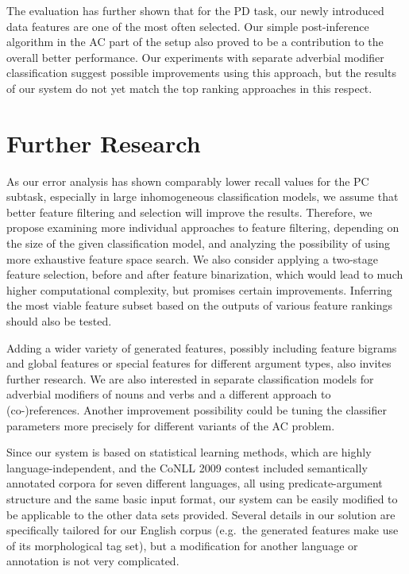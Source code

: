\documentclass[12pt,notitlepage,a4paper]{report}
\begin{document}
The evaluation has further shown that for the PD task, our newly introduced data features are one of the most often selected. Our simple post-inference algorithm in the AC part of the setup also proved to be a contribution to the overall better performance. Our experiments with separate adverbial modifier classification suggest possible improvements using this approach, but the results of our system do not yet match the top ranking approaches in this respect.

\section{Further Research}\label{further-work}

As our error analysis has shown comparably lower recall values for the PC subtask, especially in large inhomogeneous classification models, we assume that better feature filtering and selection will improve the results. Therefore, we propose examining more individual approaches to feature filtering, depending on the size of the given classification model, and analyzing the possibility of using more exhaustive feature space search. We also consider applying a two-stage feature selection, before and after feature binarization, which would lead to much higher computational complexity, but promises certain improvements. Inferring the most viable feature subset based on the outputs of various feature rankings should also be tested.

Adding a wider variety of generated features, possibly including feature bigrams and global features \citep{nugues09} or special features for different argument types, also invites further research. We are also interested in separate classification models for adverbial modifiers of nouns and verbs and a different approach to (co-)references. Another improvement possibility could be tuning the classifier parameters more precisely for different variants of the AC problem.

Since our system is based on statistical learning methods, which are highly language-independent, and the CoNLL 2009 contest included semantically annotated corpora for seven different languages, all using predicate-argument structure and the same basic input format, our system can be easily modified to be applicable to the other data sets provided. Several details in our solution are specifically tailored for our English corpus (e.g.\ the generated features make use of its morphological tag set), but a modification for another language or annotation is not very complicated.
\end{document}
